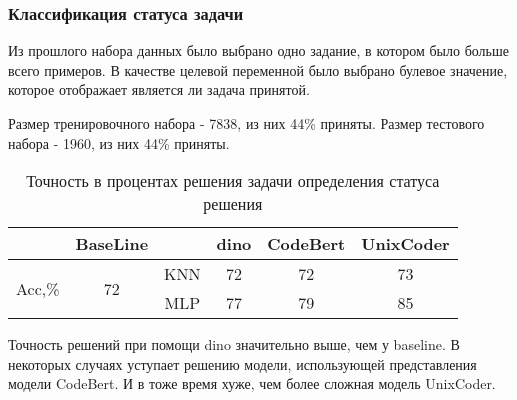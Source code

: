 \documentclass[../part_3.tex]{subfiles}
\begin{document}
\subsubsection{Классификация статуса задачи}
\par Из прошлого набора данных было выбрано одно задание, в котором было больше всего примеров. В качестве целевой переменной было выбрано булевое значение, которое отображает является ли задача принятой.
\par Размер тренировочного набора - 7838, из них 44\% приняты. Размер тестового набора - 1960, из них 44\% приняты.
\begin{table}[H]
	\centering
	\begin{tabular}{|c|c||c|c|c|c|}\hline
		                        & BaseLine            &     & \acrshort{dino} & CodeBert & UnixCoder \\ \hline
		\multirow{2}{*}{Acc,\%} & \multirow{2}{*}{72} & KNN & 72      & 72       & 73        \\\cline{3-6}
		                        &                     & MLP & 77      & 79       & 85        \\\hline
	\end{tabular}
	\caption{Точность в процентах решения задачи определения статуса решения}
\end{table}
\par Точность решений при помощи \acrshort{dino} значительно выше, чем у baseline. В некоторых случаях уступает решению модели, использующей представления модели CodeBert. И в тоже время хуже, чем более сложная модель UnixCoder. %
\end{document}
